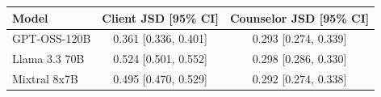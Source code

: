 \begin{tabular}{lcc}
\toprule
Model & Client JSD [95\% CI] & Counselor JSD [95\% CI] \\
\midrule
GPT-OSS-120B & 0.361 [0.336, 0.401] & 0.293 [0.274, 0.339] \\
Llama 3.3 70B & 0.524 [0.501, 0.552] & 0.298 [0.286, 0.330] \\
Mixtral 8x7B & 0.495 [0.470, 0.529] & 0.292 [0.274, 0.338] \\
\bottomrule
\end{tabular}
